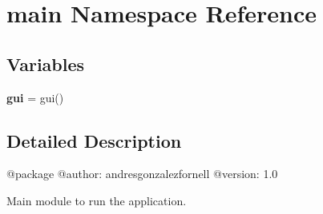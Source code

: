 \hypertarget{namespacemain}{}\section{main Namespace Reference}
\label{namespacemain}
\subsection*{Variables}
\begin{DoxyCompactItemize}
\item 
\mbox{\label{namespacemain_a361ebd575072b82410aaa1adc5024a76}} 
{\bfseries gui} = gui()
\end{DoxyCompactItemize}


\subsection{Detailed Description}
\begin{DoxyVerb}@package 
@author: andresgonzalezfornell
@version: 1.0

Main module to run the application.
\end{DoxyVerb}
 